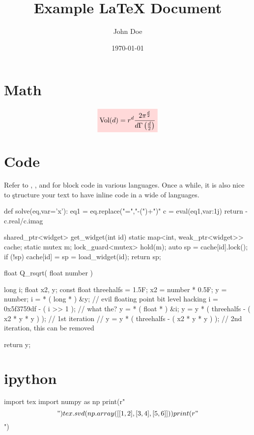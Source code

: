 \documentclass{hw}
\title{Example \LaTeX{} Document} %
\author{John Doe}                 %
\date{\today}                     %
\begin{document}
\maketitle

\section{Math}
\[\cbox{
  \text{Vol}(d) = r^d \frac{2 \pi^{\frac{d}{2}}}{d \Gamma\group{\frac{d}{2}}}
}\]


\section{Code}
Refer to , , and
 for block code in various languages. Once  a
while, it is also nice to \c{struct}ure your text to have inline code in a wide
 of languages.

\begin{Python}[%
  label=list:eqn-solver,
  caption=Linear equation solver from ActiveState
]
def solve(eq,var='x'):
    eq1 = eq.replace("=","-(")+")"
    c = eval(eq1,{var:1j})
    return -c.real/c.imag
\end{Python}

\begin{CPP}[%
  label=list:herb-sutter,
  caption=Herb Sutter's favorite ten-liner
]
shared_ptr<widget> get_widget(int id) {
    static map<int, weak_ptr<widget>> cache;
    static mutex m;
    lock_guard<mutex> hold(m);
    auto sp = cache[id].lock();
    if (!sp) cache[id] = sp = load_widget(id);
    return sp;
}
\end{CPP}

\begin{C}[%
  label=list:fast-inv-sqrt, 
  caption=Fast inverse squareroot 
]
float Q_rsqrt( float number ) {
    long i; 
    float x2, y;
    const float threehalfs = 1.5F;
    x2 = number * 0.5F;
    y  = number;
    i  = * ( long * ) &y;                       // evil floating point bit level hacking
    i  = 0x5f3759df - ( i >> 1 );               // what the?
    y  = * ( float * ) &i;
    y  = y * ( threehalfs - ( x2 * y * y ) );   // 1st iteration
//  y  = y * ( threehalfs - ( x2 * y * y ) );   // 2nd iteration, this can be removed
 
    return y;
}  
\end{C}

\section{ipython}
\begin{pycode}
import tex
import numpy as np
print(r"\[")
tex.svd(np.array([[1,2],[3,4],[5,6]]))
print(r"\]")
\end{pycode}
\end{document}
